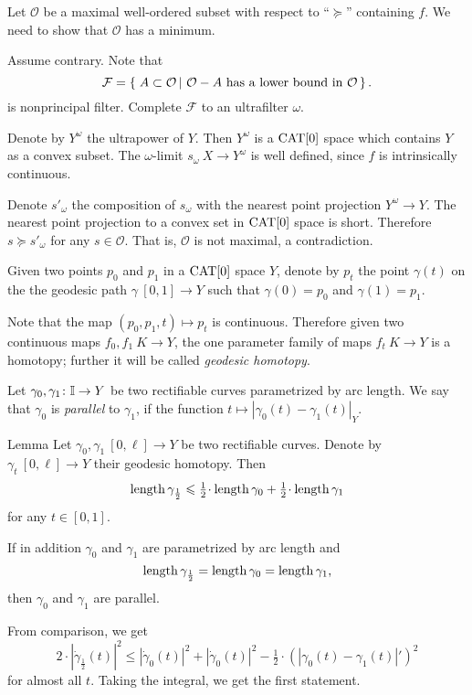 \documentclass{article}
\begin{document}
Let $\mathcal{O}$ be a maximal well-ordered subset with respect to ``$\succcurlyeq$'' containing $f$. 
We need to show that $\mathcal{O}$ has a minimum.

Assume contrary.
Note that
$$
\mathcal{F}
=
\set{A\subset\mathcal{O}}{\mathcal{O}-A\text{ has a lower bound in }\mathcal{O}}.
$$
is nonprincipal filter.
Complete $\mathcal{F}$ to an ultrafilter $\omega$. 

Denote by $Y^\omega$ the ultrapower of $Y$. 
Then $Y^\omega$
is a $\mathop{\rm CAT}\nolimits[0]$ space which contains $Y$ as a convex subset. 
The $\omega$-limit $s_\omega\:X\to Y^\omega$ is well defined, since
$f$ is intrinsically continuous. 

Denote $s'_\omega$ the composition of $s_\omega$ with the nearest point projection $Y^\omega\to Y$.
The nearest point projection to a convex set in $\mathop{\rm CAT}\nolimits[0]$ space is short.
Therefore $s\succcurlyeq s'_\omega$ for any $s\in \mathcal{O}$.
That is, $\mathcal{O}$ is not maximal, a contradiction.
\qeds

Given two points $p_0$ and $p_1$ in a $\mathop{\rm CAT}\nolimits[0]$ space $Y$,
denote by $p_t$ the point $\gamma(t)$ on the 
the geodesic path $\gamma\:[0,1]\to Y$ such that $\gamma(0)=p_0$ and $\gamma(1)=p_1$.

Note that the map $(p_0,p_1,t)\mapsto p_t$ is continuous.
Therefore given two continuous maps $f_0,f_1\:K\to Y$,
the one parameter family of maps $f_t\:K\to Y$ is a homotopy;
further it will be called \emph{geodesic homotopy}.

Let $\gamma_{0}, \gamma_1\colon\mathbb{I}\to Y$ be two rectifiable curves parametrized by arc length. 
We say that  $\gamma_{0}$ is {\em parallel} to $\gamma_{1}$, if the function $t\mapsto |\gamma_{0}(t)-\gamma_{1}(t)|_Y$.


\begin{thm}{Lemma}\label{lem:parpaths}
Let $\gamma_0,\gamma_1\:[0,\ell]\to Y$ be two rectifiable curves. 
Denote by $\gamma_t\:[0,\ell]\to Y$ their geodesic homotopy.
Then
\[\length\gamma_{\frac12}
\le \tfrac12\cdot\length\gamma_0 +\tfrac12\cdot\length\gamma_1\]
for any $t\in [0,1]$.

If in addition $\gamma_0$ and $\gamma_1$ are parametrized by arc length and 
\[\mathop{\rm length}\nolimits\gamma_{\frac12}
=\mathop{\rm length}\nolimits\gamma_0
=\mathop{\rm length}\nolimits\gamma_1,\] 
then $\gamma_{0}$ and $\gamma_{1}$ are parallel. 
\end{thm}

From comparison, we get
\[2\cdot|\dot\gamma_{\frac12}(t)|^2
\le
|\dot\gamma_{0}(t)|^2
+|\dot\gamma_{0}(t)|^2
-\tfrac12\cdot(|\gamma_{0}(t)-\gamma_{1}(t)|')^2\] 
for almost all $t$.
Taking the integral, we get the first statement.
\end{document}
